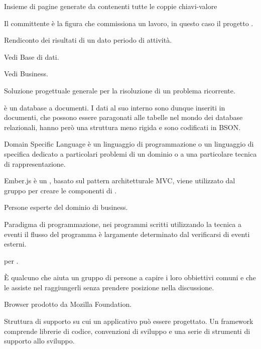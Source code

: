 Insieme di pagine generate da \ProjectName{} contenenti tutte le coppie chiavi-valore

Il committente è la figura che commissiona un lavoro, in questo caso il progetto \ProjectName{}.

Rendiconto  dei risultati di un dato periodo di attività.


Vedi Base di dati.

Vedi Business.

Soluzione progettuale generale per la risoluzione di un problema ricorrente.

 è un database a documenti. I dati al suo interno sono dunque inseriti in documenti, che possono essere paragonati alle tabelle nel mondo dei database relazionali, hanno però una struttura meno rigida e sono codificati in BSON.

Domain Specific Language è un linguaggio di programmazione o un linguaggio di specifica dedicato a particolari problemi di un dominio o a una particolare tecnica di rappresentazione.


Ember.js è un   , basato sul pattern architetturale MVC, viene utilizzato dal gruppo per creare le componenti  di \ProjectName{}.

Persone esperte del dominio di business.

Paradigma di programmazione, nei programmi scritti utilizzando la tecnica a eventi il flusso del programma è largamente determinato dal verificarsi di eventi esterni. 

 per .


È qualcuno che aiuta un gruppo di persone a capire i loro obbiettivi comuni e che le assiste nel raggiungerli senza prendere posizione nella discussione.

Browser  prodotto da Mozilla Foundation.

Struttura di supporto su cui un applicativo può essere progettato.
Un framework comprende librerie di codice, convenzioni di sviluppo e una serie di strumenti di supporto allo sviluppo.

